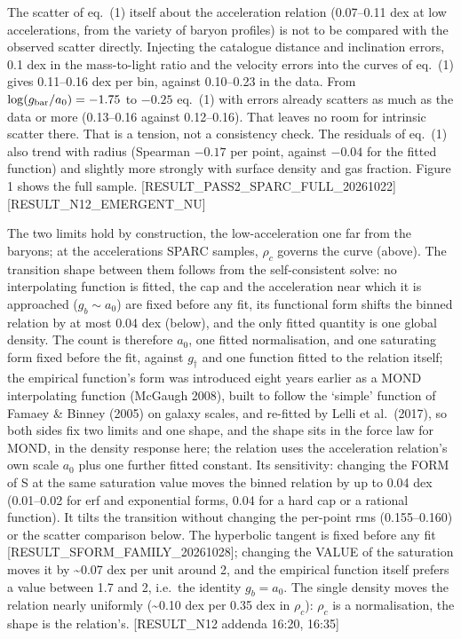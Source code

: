 \documentclass[
  10pt,
]{article}
\begin{document}
The scatter of eq.~(1) itself about the acceleration relation (0.07--0.11 dex at low accelerations, from the variety of baryon profiles) is not to be compared with the observed scatter directly. Injecting the catalogue distance and inclination errors, 0.1 dex in the mass-to-light ratio and the velocity errors into the curves of eq.~(1) gives 0.11--0.16 dex per bin, against 0.10--0.23 in the data. From $\log(g_{\rm bar}/a_0)=-1.75$ to $-0.25$ eq.~(1) with errors already scatters as much as the data or more (0.13--0.16 against 0.12--0.16). That leaves no room for intrinsic scatter there. That is a tension, not a consistency check. The residuals of eq.~(1) also trend with radius (Spearman $-0.17$ per point, against $-0.04$ for the fitted function) and slightly more strongly with surface density and gas fraction. Figure 1 shows the full sample. {[}RESULT\_PASS2\_SPARC\_FULL\_20261022{]} {[}RESULT\_N12\_EMERGENT\_NU{]}

The two limits hold by construction, the low-acceleration one far from the baryons; at the accelerations SPARC samples, $\rho_c$ governs the curve (above). The transition shape between them follows from the self-consistent solve: no interpolating function is fitted, the cap and the acceleration near which it is approached ($g_b\sim a_0$) are fixed before any fit, its functional form shifts the binned relation by at most 0.04 dex (below), and the only fitted quantity is one global density. The count is therefore $a_0$, one fitted normalisation, and one saturating form fixed before the fit, against $g_\dagger$ and one function fitted to the relation itself; the empirical function's form was introduced eight years earlier as a MOND interpolating function (McGaugh 2008), built to follow the `simple' function of Famaey \& Binney (2005) on galaxy scales, and re-fitted by Lelli et al.~(2017), so both sides fix two limits and one shape, and the shape sits in the force law for MOND, in the density response here; the relation uses the acceleration relation's own scale $a_0$ plus one further fitted constant. Its sensitivity:
changing the FORM of S at the same saturation value moves the binned relation by up to 0.04 dex (0.01--0.02 for erf and exponential forms, 0.04 for a hard cap or a rational function). It tilts the transition without changing the per-point rms (0.155--0.160) or the scatter comparison below. The hyperbolic tangent is fixed before any fit {[}RESULT\_SFORM\_FAMILY\_20261028{]};
changing the VALUE of the saturation moves it by \textasciitilde{}0.07 dex
per unit around 2, and the empirical function itself prefers
a value between 1.7 and 2, i.e.\ the identity $g_b=a_0$. The single
density moves the relation nearly uniformly (\textasciitilde{}0.10 dex per
0.35 dex in $\rho_c$): $\rho_c$ is a normalisation, the shape is the relation's.
{[}RESULT\_N12 addenda 16:20, 16:35{]}
\end{document}
